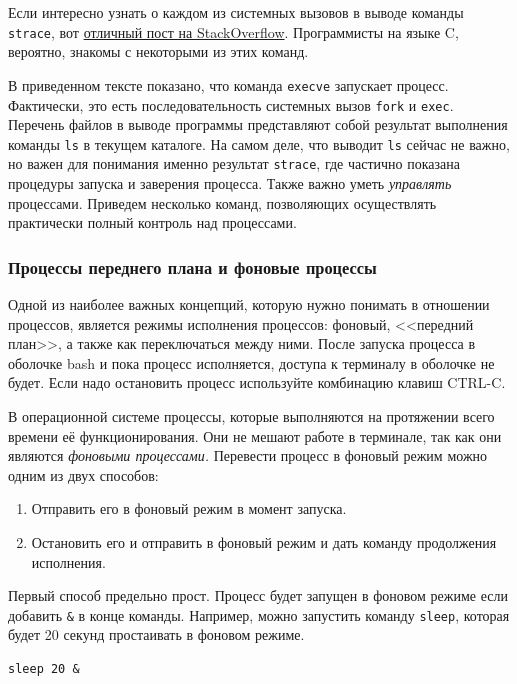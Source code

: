 \documentclass[12pt]{article}
\providecommand{\tightlist}{%
  \setlength{\itemsep}{0pt}\setlength{\parskip}{0pt}}
\begin{document}
Если интересно узнать о каждом из системных вызовов в
выводе команды \texttt{strace}, вот
\href{https://stackoverflow.com/a/6334557}{отличный пост на
StackOverflow}. Программисты на языке C, вероятно, знакомы с некоторыми
из этих команд.

В приведенном тексте показано, что команда \texttt{execve} запускает
процесс. Фактически, это есть последовательность системных вызов \texttt{fork} и \texttt{exec}.
Перечень файлов в выводе программы представляют собой
результат выполнения команды \texttt{ls} в текущем каталоге.
На самом деле, что выводит \texttt{ls} сейчас не важно, но важен для понимания
именно результат \texttt{strace}, где частично показана процедуры запуска и заверения процесса. Также важно уметь \emph{управлять}
процессами. Приведем несколько команд, позволяющих осуществлять практически полный
контроль над процессами.

\hypertarget{Foreground-vs-Background-Processes}{%
\subsubsection{\texorpdfstring{\protect\hyperlink{Foreground-vs-Background-Processes}{}Процессы
переднего плана и фоновые
процессы}{Процессы переднего плана и фоновые процессы}}\label{Foreground-vs-Background-Processes}}

Одной из наиболее важных концепций, которую нужно понимать в отношении
процессов, является режимы исполнения процессов: фоновый, <<передний план>>, а также как
переключаться между ними. После запуска процесса в оболочке bash и пока
процесс исполняется, доступа к терминалу в оболочке не будет. Если надо остановить
процесс используйте комбинацию клавиш CTRL-C.

В операционной системе процессы, которые
выполняются на протяжении всего времени её функционирования. Они не мешают работе в
терминале, так как они являются \emph{фоновыми процессами.}
Перевести процесс в фоновый режим можно одним из двух способов:
\begin{enumerate}
\tightlist
\item
  Отправить его в фоновый режим в момент запуска.
\item
  Остановить его и отправить в фоновый режим и дать команду продолжения
  исполнения.
\end{enumerate}

Первый способ предельно прост. Процесс будет запущен в фоновом режиме если
добавить \texttt{\&} в конце команды. Например, можно запустить команду
\texttt{sleep}, которая будет 20 секунд простаивать в фоновом режиме.
\begin{verbatim}
sleep 20 &
\end{verbatim}
\end{document}
